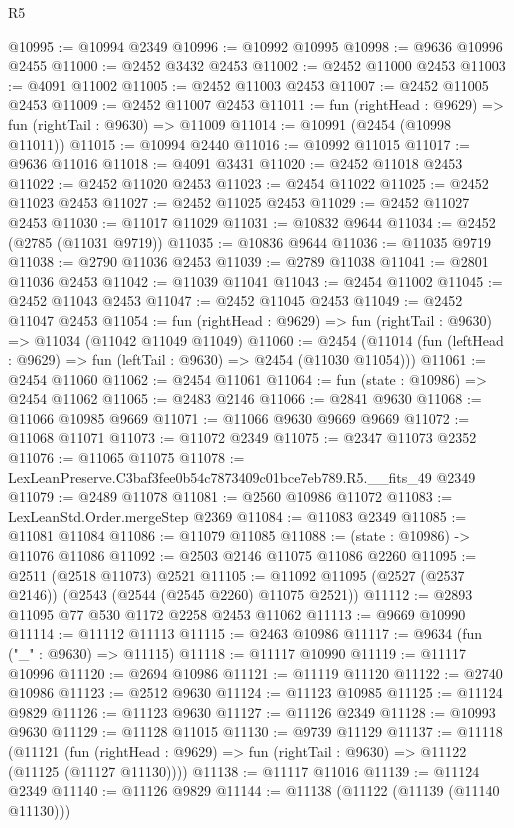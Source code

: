\begin{lexlean}{R5}
\begin{coremodule}
@10995 := @10994 @2349
@10996 := @10992 @10995
@10998 := @9636 @10996 @2455
@11000 := @2452 @3432 @2453
@11002 := @2452 @11000 @2453
@11003 := @4091 @11002
@11005 := @2452 @11003 @2453
@11007 := @2452 @11005 @2453
@11009 := @2452 @11007 @2453
@11011 := fun (rightHead : @9629) => fun (rightTail : @9630) => @11009
@11014 := @10991 (@2454 (@10998 @11011))
@11015 := @10994 @2440
@11016 := @10992 @11015
@11017 := @9636 @11016
@11018 := @4091 @3431
@11020 := @2452 @11018 @2453
@11022 := @2452 @11020 @2453
@11023 := @2454 @11022
@11025 := @2452 @11023 @2453
@11027 := @2452 @11025 @2453
@11029 := @2452 @11027 @2453
@11030 := @11017 @11029
@11031 := @10832 @9644
@11034 := @2452 (@2785 (@11031 @9719))
@11035 := @10836 @9644
@11036 := @11035 @9719
@11038 := @2790 @11036 @2453
@11039 := @2789 @11038
@11041 := @2801 @11036 @2453
@11042 := @11039 @11041
@11043 := @2454 @11002
@11045 := @2452 @11043 @2453
@11047 := @2452 @11045 @2453
@11049 := @2452 @11047 @2453
@11054 := fun (rightHead : @9629) => fun (rightTail : @9630) => @11034 (@11042 @11049 @11049)
@11060 := @2454 (@11014 (fun (leftHead : @9629) => fun (leftTail : @9630) => @2454 (@11030 @11054)))
@11061 := @2454 @11060
@11062 := @2454 @11061
@11064 := fun (state : @10986) => @2454 @11062
@11065 := @2483 @2146
@11066 := @2841 @9630
@11068 := @11066 @10985 @9669
@11071 := @11066 @9630 @9669 @9669
@11072 := @11068 @11071
@11073 := @11072 @2349
@11075 := @2347 @11073 @2352
@11076 := @11065 @11075
@11078 := LexLeanPreserve.C3baf3fee0b54c7873409c01bce7eb789.R5.__fits_49 @2349
@11079 := @2489 @11078
@11081 := @2560 @10986 @11072
@11083 := LexLeanStd.Order.mergeStep @2369
@11084 := @11083 @2349
@11085 := @11081 @11084
@11086 := @11079 @11085
@11088 := (state : @10986) -> @11076 @11086
@11092 := @2503 @2146 @11075 @11086 @2260
@11095 := @2511 (@2518 @11073) @2521
@11105 := @11092 @11095 (@2527 (@2537 @2146)) (@2543 (@2544 (@2545 @2260) @11075 @2521))
@11112 := @2893 @11095 @77 @530 @1172 @2258 @2453 @11062
@11113 := @9669 @10990
@11114 := @11112 @11113
@11115 := @2463 @10986
@11117 := @9634 (fun ("_" : @9630) => @11115)
@11118 := @11117 @10990
@11119 := @11117 @10996
@11120 := @2694 @10986
@11121 := @11119 @11120
@11122 := @2740 @10986
@11123 := @2512 @9630
@11124 := @11123 @10985
@11125 := @11124 @9829
@11126 := @11123 @9630
@11127 := @11126 @2349
@11128 := @10993 @9630
@11129 := @11128 @11015
@11130 := @9739 @11129
@11137 := @11118
    (@11121 (fun (rightHead : @9629) => fun (rightTail : @9630) => @11122 (@11125 (@11127 @11130))))
@11138 := @11117 @11016
@11139 := @11124 @2349
@11140 := @11126 @9829
@11144 := @11138 (@11122 (@11139 (@11140 @11130)))

\end{coremodule}
\end{lexlean}
